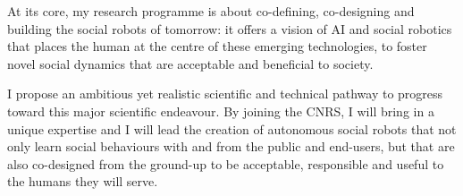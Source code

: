 \begin{framed}

\bf

At its core, my research programme is about co-defining, co-designing and
building the social robots of tomorrow: it offers a vision of AI and social
robotics that places the human at the centre of these emerging technologies,
to foster novel social dynamics that are acceptable and beneficial to
society.

I propose an ambitious yet realistic scientific and technical pathway to
progress toward this major scientific endeavour. By joining the CNRS, I will
bring in a unique expertise and I will lead the creation of autonomous
social robots that not only learn social behaviours with and from the public
and end-users, but that are also co-designed from the ground-up to be
acceptable, responsible and useful to the humans they will serve.


\end{framed}


